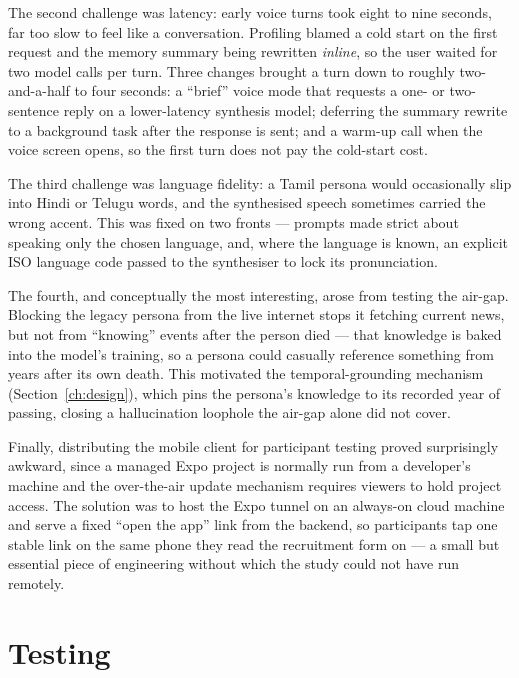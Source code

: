 \documentclass[11pt,a4paper]{report}
\begin{document}
The second challenge was latency: early voice turns took eight to nine seconds, far too slow to feel like a conversation. Profiling blamed a cold start on the first request and the memory summary being rewritten \emph{inline}, so the user waited for two model calls per turn. Three changes brought a turn down to roughly two-and-a-half to four seconds: a ``brief'' voice mode that requests a one- or two-sentence reply on a lower-latency synthesis model; deferring the summary rewrite to a background task after the response is sent; and a warm-up call when the voice screen opens, so the first turn does not pay the cold-start cost.

The third challenge was language fidelity: a Tamil persona would occasionally slip into Hindi or Telugu words, and the synthesised speech sometimes carried the wrong accent. This was fixed on two fronts --- prompts made strict about speaking only the chosen language, and, where the language is known, an explicit ISO language code passed to the synthesiser to lock its pronunciation.

The fourth, and conceptually the most interesting, arose from testing the air-gap. Blocking the legacy persona from the live internet stops it fetching current news, but not from ``knowing'' events after the person died --- that knowledge is baked into the model's training, so a persona could casually reference something from years after its own death. This motivated the temporal-grounding mechanism (Section~\ref{ch:design}), which pins the persona's knowledge to its recorded year of passing, closing a hallucination loophole the air-gap alone did not cover.

Finally, distributing the mobile client for participant testing proved surprisingly awkward, since a managed Expo project is normally run from a developer's machine and the over-the-air update mechanism requires viewers to hold project access. The solution was to host the Expo tunnel on an always-on cloud machine and serve a fixed ``open the app'' link from the backend, so participants tap one stable link on the same phone they read the recruitment form on --- a small but essential piece of engineering without which the study could not have run remotely.

\chapter{Testing}
\label{ch:testing}
\end{document}
